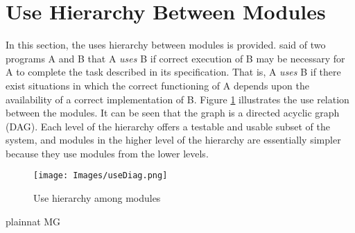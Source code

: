 \documentclass[12pt, titlepage]{article}
\begin{document}
\section{Use Hierarchy Between Modules} \label{SecUse}%

In this section, the uses hierarchy between modules is
provided. \citet{Parnas1978} said of two programs A and B that A {\em uses} B if
correct execution of B may be necessary for A to complete the task described in
its specification. That is, A {\em uses} B if there exist situations in which
the correct functioning of A depends upon the availability of a correct
implementation of B.  Figure \ref{FigUH} illustrates the use relation between
the modules. It can be seen that the graph is a directed acyclic graph
(DAG). Each level of the hierarchy offers a testable and usable subset of the
system, and modules in the higher level of the hierarchy are essentially simpler
because they use modules from the lower levels.

\begin{figure}[H]
\centering
\caption{Use hierarchy among modules}
\label{FigUH}
\begin{center}
	\texttt{[image: Images/useDiag.png]}
\end{center}
\end{figure}


 {plainnat}
 {MG}
\end{document}
